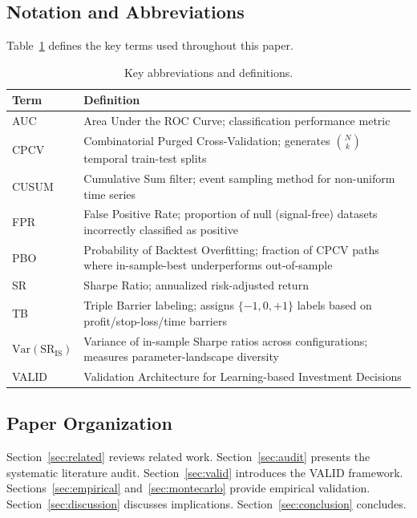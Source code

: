 \documentclass[preprint,12pt,authoryear]{elsarticle}
\begin{document}
\subsection{Notation and Abbreviations}

Table~\ref{tab:glossary} defines the key terms used throughout this paper.

\begin{table}[htbp]
\centering
\caption{Key abbreviations and definitions.}
\label{tab:glossary}
\small
\begin{tabular}{lp{10cm}}
\toprule
Term & Definition \\
\midrule
AUC & Area Under the ROC Curve; classification performance metric \\
CPCV & Combinatorial Purged Cross-Validation; generates $\binom{N}{k}$ temporal train-test splits \\
CUSUM & Cumulative Sum filter; event sampling method for non-uniform time series \\
FPR & False Positive Rate; proportion of null (signal-free) datasets incorrectly classified as positive \\
PBO & Probability of Backtest Overfitting; fraction of CPCV paths where in-sample-best underperforms out-of-sample \\
SR & Sharpe Ratio; annualized risk-adjusted return \\
TB & Triple Barrier labeling; assigns $\{-1, 0, +1\}$ labels based on profit/stop-loss/time barriers \\
$\mathrm{Var}(\mathrm{SR}_{\mathrm{IS}})$ & Variance of in-sample Sharpe ratios across configurations; measures parameter-landscape diversity \\
VALID & Validation Architecture for Learning-based Investment Decisions \\
\bottomrule
\end{tabular}
\end{table}

\subsection{Paper Organization}

Section~\ref{sec:related} reviews related work. Section~\ref{sec:audit} presents the systematic literature audit. Section~\ref{sec:valid} introduces the VALID framework. Sections~\ref{sec:empirical} and~\ref{sec:montecarlo} provide empirical validation. Section~\ref{sec:discussion} discusses implications. Section~\ref{sec:conclusion} concludes.
\end{document}
